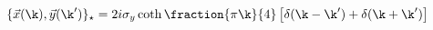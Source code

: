 \begin{equation}\{\vec{x}(\k),\vec{y}(\k')\}_\star=2i\sigma_y \coth\fraction{\pi \k}{4}
\left[\delta(\k-\k')+\delta(\k+\k')\right]\label{eq:continuous-gcom}\end{equation}

